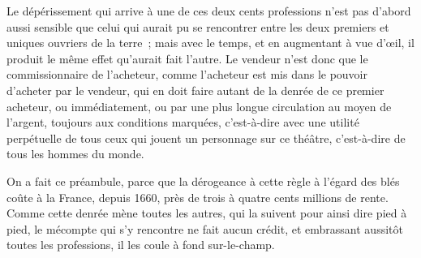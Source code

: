 \documentclass[french,twoside]{book} %
\begin{document}
Le dépérissement qui arrive à une de ces deux cents professions n’est pas d’abord aussi sensible que celui qui aurait pu se rencontrer entre les deux premiers et uniques ouvriers de la terre ; mais avec le temps, et en augmentant à vue d’œil, il produit le même effet qu’aurait fait l’autre. Le vendeur n’est donc que le commissionnaire de l’acheteur, comme l’acheteur est mis dans le pouvoir d’acheter par le vendeur, qui en doit faire autant de la denrée de ce premier acheteur, ou immédiatement, ou par une plus longue circulation au moyen de l’argent, toujours aux conditions marquées, c’est-à-dire avec une utilité perpétuelle de tous ceux qui jouent un personnage sur ce théâtre, c’est-à-dire de tous les hommes du monde.\par
On a fait ce préambule, parce que la dérogeance à cette règle à l’égard des blés coûte à la France, depuis 1660, près de trois à quatre cents millions de rente. Comme cette denrée mène toutes les autres, qui la suivent pour ainsi dire pied à pied, le mécompte qui s’y rencontre ne fait aucun crédit, et embrassant aussitôt toutes les professions, il les coule à fond sur-le-champ.\par
\end{document}
